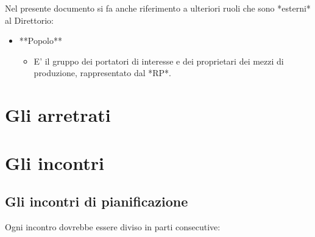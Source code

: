 Nel presente documento si fa anche riferimento a ulteriori ruoli che sono *esterni* al Direttorio:
\begin{itemize}
\item **Popolo**
  \begin{itemize}
    \item E' il gruppo dei portatori di interesse e dei proprietari dei mezzi di produzione, rappresentato dal *RP*.
  \end{itemize}
\end{itemize}

\section{Gli arretrati}


\section{Gli incontri}

\subsection{Gli incontri di pianificazione}

Ogni incontro dovrebbe essere diviso in parti consecutive:

